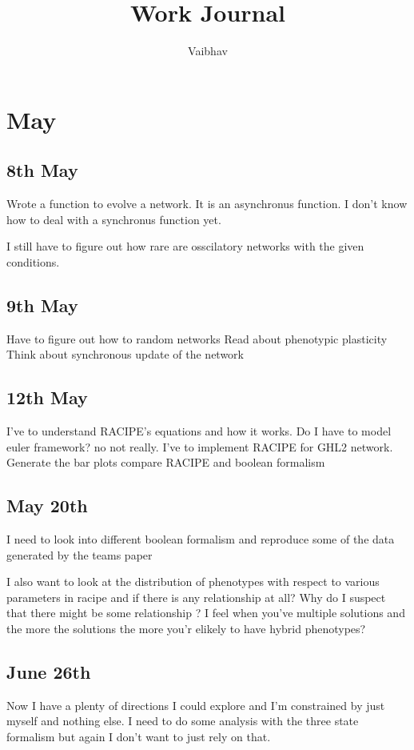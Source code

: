 \documentclass{article}
\title{Work Journal}
\author{Vaibhav }
\begin{document}
\maketitle
\section{May}
\subsection{8th May}

Wrote  a function to evolve a network. It is an asynchronus function. I  don't know how to deal with a synchronus function yet. 

I still have to figure out how rare are osscilatory networks with the given conditions. 

\subsection{9th May}
Have to figure out how to random networks
Read about phenotypic plasticity
Think about synchronous update of the network

\subsection{12th May}
I've to understand RACIPE's equations and how it works. Do I have to model euler framework? no not really. I've to implement RACIPE for GHL2 network. Generate the bar plots compare RACIPE and boolean formalism 

\subsection{May 20th}
I need to look into different boolean formalism and reproduce some of the data generated by the teams paper 

I also want to look at the distribution of phenotypes with respect to various parameters in racipe and if there is any relationship at all? Why do I suspect that there might be some relationship ? I feel when you've multiple solutions and the more the solutions the more you'r elikely to have hybrid phenotypes? 

\subsection{June 26th} 

Now I have a plenty of directions I could explore and I'm constrained by just myself and nothing else. 
I need to do some analysis with the three state formalism but again I don't want to just rely on that. 
\end{document}
